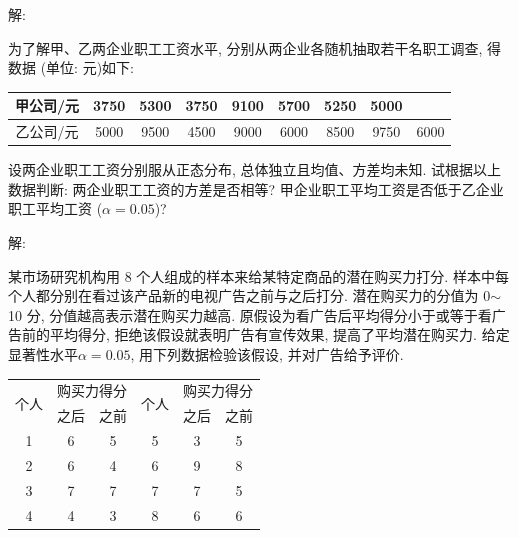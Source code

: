 \documentclass[standard]{ExBook}
\begin{document}
\begin{qitems}
\vspace{-5em}

    \begin{bbox}
解: 
    \end{bbox}

\vspace{-5em}

    \begin{bbox}
    \begin{shaded}
        \qitem
为了解甲、乙两企业职工工资水平, 分别从两企业各随机抽取若干名职工调查, 得数据 (单位: 元)如下:
\begin{center}
\setlength{\tabcolsep}{13.5pt}
\begin{tabular}{c|cccccccc}
\hline
甲公司/元 & 3750 & 5300 & 3750 & 9100 & 5700 & 5250 & 5000 &  \\
\hline
乙公司/元 & 5000 & 9500 & 4500 & 9000 & 6000 & 8500 & 9750 & 6000 \\
\hline
\end{tabular}
\end{center}
设两企业职工工资分别服从正态分布, 总体独立且均值、方差均未知. 试根据以上数据判断: 两企业职工工资的方差是否相等? 甲企业职工平均工资是否低于乙企业职工平均工资 ($\alpha=0.05$)?
    \end{shaded}
    \end{bbox}

\vspace{-5em}

    \begin{bbox}
解: 
    \end{bbox}

\vspace{-5em}

    \begin{bbox}
    \begin{shaded}
        \qitem
某市场研究机构用 8 个人组成的样本来给某特定商品的潜在购买力打分. 样本中每个人都分别在看过该产品新的电视广告之前与之后打分. 潜在购买力的分值为 0$\sim$10 分, 分值越高表示潜在购买力越高. 原假设为看广告后平均得分小于或等于看广告前的平均得分, 拒绝该假设就表明广告有宣传效果, 提高了平均潜在购买力. 给定显著性水平$\alpha=0.05$, 用下列数据检验该假设, 并对广告给予评价.
\begin{center}
\setlength{\tabcolsep}{28pt}
\begin{tabular}{c|cc||c|cc}
\hline
\multirow{2}{*}{个人} & \multicolumn{2}{c||}{购买力得分} & \multirow{2}{*}{个人} & \multicolumn{2}{c}{购买力得分} \\ 
\cline{2-3} \cline{5-6}
 & \multicolumn{1}{c}{之后} & \multicolumn{1}{c||}{之前} & & \multicolumn{1}{c}{之后} & \multicolumn{1}{c}{之前} \\ \hline
1 & 6 & 5 & 5 & 3 & 5 \\
2 & 6 & 4 & 6 & 9 & 8 \\
3 & 7 & 7 & 7 & 7 & 5 \\
4 & 4 & 3 & 8 & 6 & 6 \\
\hline
\end{tabular}
\end{center}
    \end{shaded}
    \end{bbox}


\end{qitems}
\end{document}
